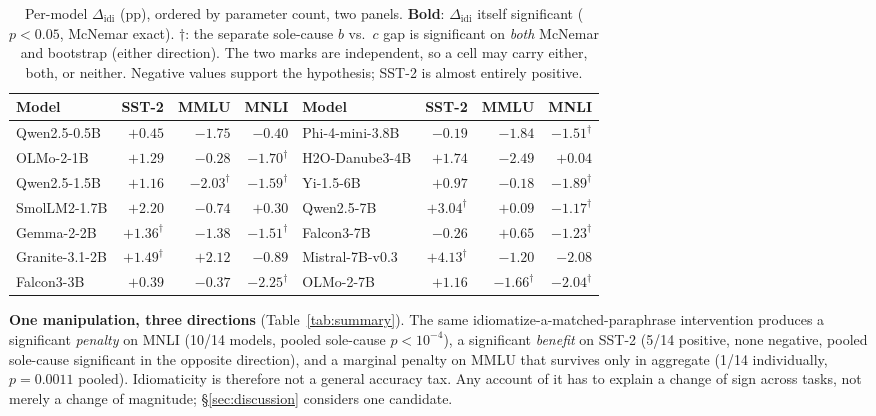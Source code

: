 \documentclass{article}   %
\begin{document}
\begin{table}[t]
\centering
\caption{Per-model $\Delta_{\text{idi}}$ (pp), ordered by parameter count, two
panels. \textbf{Bold}: $\Delta_{\text{idi}}$ itself significant ($p < 0.05$,
McNemar exact). $\dagger$: the separate sole-cause $b$ vs.\ $c$ gap is
significant on \emph{both} McNemar and bootstrap (either direction). The two
marks are independent, so a cell may carry either, both, or neither. Negative
values support the hypothesis; SST-2 is almost entirely positive.}
\label{tab:permodel}
\scriptsize
\setlength{\tabcolsep}{4pt}
\begin{tabular}{lrrr@{\hskip 1.4em}lrrr}
\toprule
Model & SST-2 & MMLU & MNLI & Model & SST-2 & MMLU & MNLI \\
\midrule
Qwen2.5-0.5B & $+0.45$ & $-1.75$ & $-0.40$ & Phi-4-mini-3.8B & $-0.19$ & $-1.84$ & $\bm{-1.51}^{\dagger}$ \\
OLMo-2-1B & $+1.29$ & $-0.28$ & $\bm{-1.70}^{\dagger}$ & H2O-Danube3-4B & $\bm{+1.74}$ & $\bm{-2.49}$ & $+0.04$ \\
Qwen2.5-1.5B & $+1.16$ & $-2.03^{\dagger}$ & $\bm{-1.59}^{\dagger}$ & Yi-1.5-6B & $+0.97$ & $-0.18$ & $\bm{-1.89}^{\dagger}$ \\
SmolLM2-1.7B & $\bm{+2.20}$ & $-0.74$ & $+0.30$ & Qwen2.5-7B & $\bm{+3.04}^{\dagger}$ & $+0.09$ & $\bm{-1.17}^{\dagger}$ \\
Gemma-2-2B & $+1.36^{\dagger}$ & $-1.38$ & $\bm{-1.51}^{\dagger}$ & Falcon3-7B & $-0.26$ & $+0.65$ & $\bm{-1.23}^{\dagger}$ \\
Granite-3.1-2B & $\bm{+1.49}^{\dagger}$ & $+2.12$ & $-0.89$ & Mistral-7B-v0.3 & $\bm{+4.13}^{\dagger}$ & $-1.20$ & $\bm{-2.08}$ \\
Falcon3-3B & $+0.39$ & $-0.37$ & $\bm{-2.25}^{\dagger}$ & OLMo-2-7B & $+1.16$ & $-1.66^{\dagger}$ & $\bm{-2.04}^{\dagger}$ \\
\bottomrule
\end{tabular}
\end{table}

\textbf{One manipulation, three directions} (Table~\ref{tab:summary}). The same
idiomatize-a-matched-paraphrase intervention produces a significant
\emph{penalty} on MNLI (10/14 models, pooled sole-cause $p<10^{-4}$), a
significant \emph{benefit} on SST-2 (5/14 positive, none negative, pooled
sole-cause significant in the opposite direction), and a marginal penalty on
MMLU that survives only in aggregate (1/14 individually, $p=0.0011$ pooled).
Idiomaticity is therefore not a general accuracy tax. Any account of it has to
explain a change of sign across tasks, not merely a change of magnitude;
\S\ref{sec:discussion} considers one candidate.
\end{document}
